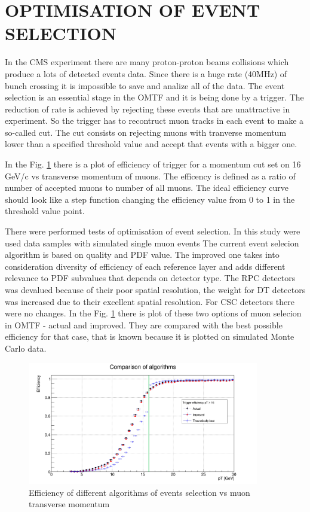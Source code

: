 \section{OPTIMISATION OF EVENT SELECTION}  

In the CMS experiment there are many proton-proton beams collisions which produce a lots of detected events data.
Since there is a huge rate (40MHz) of bunch crossing it is impossible to save and analize all of the data.
The event selection is an essential stage in the OMTF and it is being done by a trigger.
The reduction of rate is achieved by rejecting these events that are unattractive in experiment.
So the trigger has to recontruct muon tracks in each event to make a so-called cut.
The cut consists on rejecting muons with tranverse momentum lower than a specified threshold value and accept that events with a bigger one.

In the Fig. \ref{eff} there is a plot of efficiency of trigger for a momentum cut set on 16 GeV/c vs transverse momentum of muons.
The efficency is defined as a ratio of number of accepted muons to number of all muons.
The ideal efficiency curve should look like a step function changing the efficiency value from 0 to 1 in the threshold value point.

There were performed tests of optimisation of event selection.
In this study were used data samples with simulated single muon events
The current event selecion algorithm is based on quality and PDF value.
The improved one takes into consideration diversity of efficiency of each reference layer and adds different relevance to PDF subvalues that depends on detector type.
The RPC detectors was devalued because of their poor spatial resolution, the weight for DT detectors was increased due to their excellent spatial resolution.
For CSC detectors there were no changes.
In the Fig. \ref{eff} there is plot of these two options of muon selecion in OMTF - actual and improved.
They are compared with the best possible efficiency for that case, that is known because it is plotted on simulated Monte Carlo data.

\begin{figure}[ht]
\centering
\includegraphics[width=0.9\textwidth]{Hist16.png}
\caption{Efficiency of different algorithms of events selection vs muon transverse momentum}
\label{eff}
\end{figure} 

